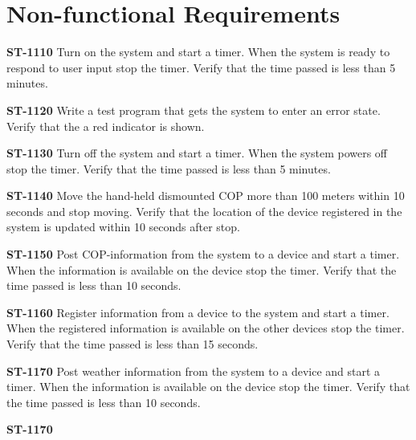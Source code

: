 \section{Non-functional Requirements}

\textbf{ST-1110} Turn on the system and start a timer. When the system is ready to respond to user input stop the timer. Verify that the time passed is less than 5 minutes. 

\textbf{ST-1120} Write a test program that gets the system to enter an error state. Verify that the a red indicator is shown. 

\textbf{ST-1130} Turn off the system and start a timer. When the system powers off stop the timer. Verify that the time passed is less than 5 minutes.

\textbf{ST-1140} Move the hand-held dismounted COP more than 100 meters within 10 seconds and stop moving. Verify that the location of the device registered in the system is updated within 10 seconds after stop. 

\textbf{ST-1150} Post COP-information from the system to a device and start a timer. When the information is available on the device stop the timer. Verify that the time passed is less than 10 seconds. 

\textbf{ST-1160} Register information from a device to the system and start a timer. When the registered information is available on the other devices stop the timer. Verify that the time passed is less than 15 seconds. 

\textbf{ST-1170} Post weather information from the system to a device and start a timer. When the information is available on the device stop the timer. Verify that the time passed is less than 10 seconds. 

\textbf{ST-1170} 